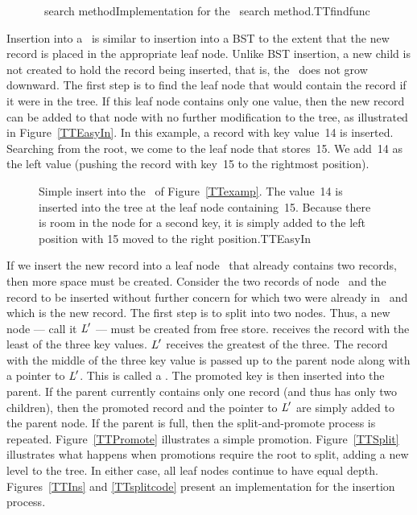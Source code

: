 
\begin{figure}

\vspace{-\bigskipamount}
\capt{4.5in}
{\TTtree\ search method}{Implementation for the \TTtree\ search
method.}{TTfindfunc}
\end{figure}

Insertion into a \TTtree\ is similar to insertion into a BST to the
extent that the new record is placed in the appropriate leaf node.
Unlike BST insertion, a new child is not created to hold the record
being inserted, that is, the \TTtree\ does not grow
downward.
The first step is to find the leaf node that would contain the record
if it were in the tree.
If this leaf node contains only one value, then the new record can be
added to that node with no further modification to the tree, as
illustrated in Figure~\ref{TTEasyIn}.
In this example, a record with key value~14 is inserted.
Searching from the root, we come to the leaf node that stores~15.
We add~14 as the left value (pushing the record with key~15 to the
rightmost position).

\begin{figure}
\vspace{-\medskipamount}

{Simple insert into the \TTtree\ of Figure~\ref{TTexamp}.
The value~14 is inserted into the tree at the leaf node containing~15.
Because there is room in the node for a second key, it is simply added
to the left position with 15 moved to the right position.}{TTEasyIn}
\medskip
\end{figure}

If we insert the new record into a leaf node~ that already
contains two records, then more space must be created.
Consider the two records of node~ and the record to be
inserted without further concern for which two
were already in~ and which is the new record.
The first step is to split  into two nodes.
Thus, a new node --- call it \({\textit{L}}'\) --- must be created from free
store.
 receives the record with the least of the three key values.
\({\textit{L}}'\) receives the greatest of the three.
The record with the middle of the three key value is passed up to the
parent node along with a pointer to \({\textit{L}}'\).
This is called a .
The promoted key is then inserted into the parent.
If the parent currently contains only one record (and thus has only
two children), then the promoted record and the pointer to
\({\textit{L}}'\) are simply added to the parent node.
If the parent is full, then the split-and-promote process is repeated.
Figure~\ref{TTPromote} illustrates a simple promotion.
Figure~\ref{TTSplit} illustrates what happens when promotions
require the root to split, adding a new level to the tree.
In either case, all leaf nodes continue to have equal depth.
Figures~\ref{TTIns} and \ref{TTsplitcode} present an
implementation for the insertion process.

